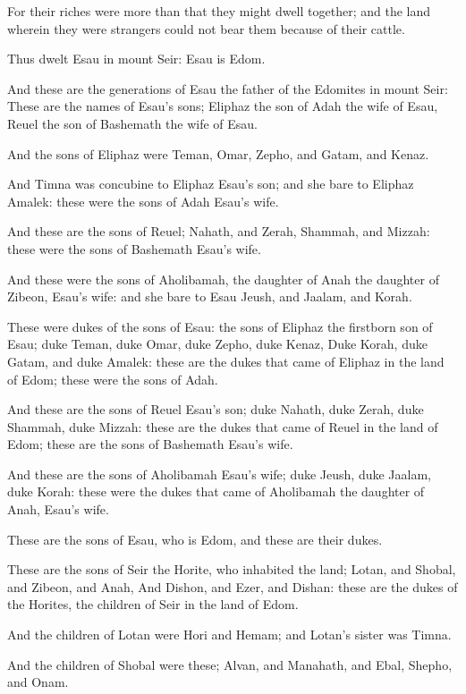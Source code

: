 \Verse For their riches were more than that they might dwell together; and the land wherein they were strangers could not bear them because of their cattle.

\Verse Thus dwelt Esau in mount Seir: Esau is Edom.

\Verse And these are the generations of Esau the father of the Edomites in mount Seir: \Verse These are the names of Esau's sons; Eliphaz the son of Adah the wife of Esau, Reuel the son of Bashemath the wife of Esau.

\Verse And the sons of Eliphaz were Teman, Omar, Zepho, and Gatam, and Kenaz.

\Verse And Timna was concubine to Eliphaz Esau's son; and she bare to Eliphaz Amalek: these were the sons of Adah Esau's wife.

\Verse And these are the sons of Reuel; Nahath, and Zerah, Shammah, and Mizzah: these were the sons of Bashemath Esau's wife.

\Verse And these were the sons of Aholibamah, the daughter of Anah the daughter of Zibeon, Esau's wife: and she bare to Esau Jeush, and Jaalam, and Korah.

\Verse These were dukes of the sons of Esau: the sons of Eliphaz the firstborn son of Esau; duke Teman, duke Omar, duke Zepho, duke Kenaz, \Verse Duke Korah, duke Gatam, and duke Amalek: these are the dukes that came of Eliphaz in the land of Edom; these were the sons of Adah.

\Verse And these are the sons of Reuel Esau's son; duke Nahath, duke Zerah, duke Shammah, duke Mizzah: these are the dukes that came of Reuel in the land of Edom; these are the sons of Bashemath Esau's wife.

\Verse And these are the sons of Aholibamah Esau's wife; duke Jeush, duke Jaalam, duke Korah: these were the dukes that came of Aholibamah the daughter of Anah, Esau's wife.

\Verse These are the sons of Esau, who is Edom, and these are their dukes.

\Verse These are the sons of Seir the Horite, who inhabited the land; Lotan, and Shobal, and Zibeon, and Anah, \Verse And Dishon, and Ezer, and Dishan: these are the dukes of the Horites, the children of Seir in the land of Edom.

\Verse And the children of Lotan were Hori and Hemam; and Lotan's sister was Timna.

\Verse And the children of Shobal were these; Alvan, and Manahath, and Ebal, Shepho, and Onam.

